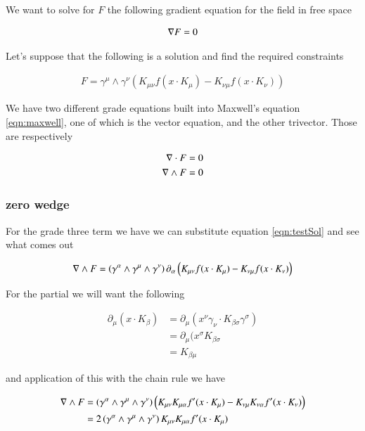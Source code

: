 \documentclass{article}
\begin{document}
We want to solve for $F$ the following gradient equation for the field in free space

\begin{align}\label{eqn:maxwell}
\nabla F = 0
\end{align}

Let's suppose that the following is a solution and find the required constraints

\begin{align}\label{eqn:testSol}
F = \gamma^\mu \wedge \gamma^\nu \left( K_{\mu\nu} f( x \cdot K_\mu ) -K_{\nu\mu} f( x \cdot K_\nu ) \right)
\end{align}

We have two different grade equations built into Maxwell's equation \ref{eqn:maxwell}, one of which is the vector equation, and the other
trivector.  Those are respectively

\begin{align*}
\nabla \cdot F &= 0 \\
\nabla \wedge F &= 0
\end{align*}

\subsubsection{ zero wedge }

For the grade three term we have we can substitute equation \ref{eqn:testSol} and see what comes out

\begin{align*}
\nabla \wedge F 
&= 
\left( \gamma^\alpha \wedge \gamma^\mu \wedge \gamma^\nu\right)
\partial_\alpha \left( K_{\mu\nu} f( x \cdot K_\mu ) -K_{\nu\mu} f( x \cdot K_\nu ) \right) \\
\end{align*}

For the partial we will want the following

\begin{align*}
\partial_\mu ( x \cdot K_\beta ) 
&= \partial_\mu ( x^\nu \gamma_\nu \cdot K_{\beta\sigma} \gamma^\sigma ) \\
&= \partial_\mu ( x^\sigma K_{\beta\sigma} \\
&= K_{\beta\mu}
\end{align*}

and application of this with the chain rule we have

\begin{align*}
\nabla \wedge F 
&= 
\left( \gamma^\alpha \wedge \gamma^\mu \wedge \gamma^\nu\right)
\left( K_{\mu\nu} K_{\mu\alpha} f'( x \cdot K_\mu ) -K_{\nu\mu} K_{\nu\alpha} f'( x \cdot K_\nu ) \right) \\
&= 
2\left( \gamma^\alpha \wedge \gamma^\mu \wedge \gamma^\nu\right) K_{\mu\nu} K_{\mu\alpha} f'( x \cdot K_\mu ) 
\\
\end{align*}
\end{document}
